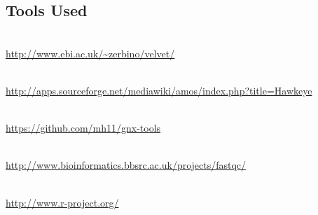\subsection{Tools Used}
\begin{description}[style=multiline,labelindent=0cm,align=left,leftmargin=1cm]
  \item[Velvet] \hfill\\
  	\url{http://www.ebi.ac.uk/~zerbino/velvet/}
  \item[AMOS Hawkeye] \hfill\\
    \url{http://apps.sourceforge.net/mediawiki/amos/index.php?title=Hawkeye}
  \item[gnx-tools] \hfill\\
    \url{https://github.com/mh11/gnx-tools}
  \item[FastQC] \hfill\\
    \url{http://www.bioinformatics.bbsrc.ac.uk/projects/fastqc/}
  \item[R] \hfill\\
    \url{http://www.r-project.org/}
\end{description}

